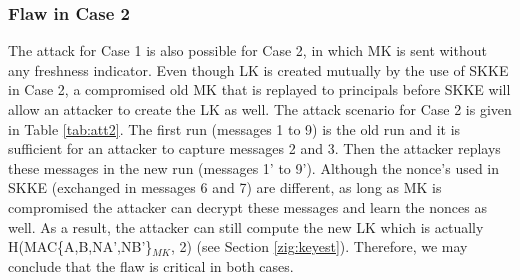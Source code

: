 \subsubsection{Flaw in Case 2}
The attack for Case 1 is also possible for Case 2, in which MK is sent without any freshness indicator. 
Even though LK is created mutually by the use of SKKE in Case 2, 
a compromised old MK that is replayed to principals before SKKE will allow an attacker to create the LK as well. 
The attack scenario for Case 2 is given in Table \ref{tab:att2}. 
The first run (messages 1 to 9) is the old run and it is sufficient for an attacker to capture messages 2 and 3. 
Then the attacker replays these messages in the new run (messages 1' to 9').
Although the nonce's used in SKKE (exchanged in messages 6 and 7) are different, 
as long as MK is compromised the attacker can decrypt these messages and learn the nonces as well.
As a result, the attacker can still compute the new LK which is actually H(MAC\{A,B,NA',NB'\}$_{MK}$, 2) (see Section \ref{zig:keyest}).
Therefore, we may conclude that the flaw is critical in both cases. 

